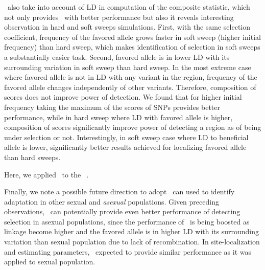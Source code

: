 \comale\ also take into account of LD in computation of the composite 
statistic, which not only provides \comale\ with better performance but also it 
reveals interesting observation in hard and soft sweeps simulations.
First, with the same selection coefficient, frequency of the favored allele 
grows faster in soft sweep (higher initial frequency) than hard sweep, which 
makes identification of selection in soft sweeps a substantially easier task.
Second, favored allele is in lower LD with its surrounding variation in soft 
sweep than hard sweep. In the most extreme case where favored allele is not in 
LD with any variant in the region, frequency of the favored allele changes 
independently of other variants. Therefore, composition of scores does not 
improve power of detection. We found that for higher initial frequency taking 
the maximum of the scores of SNPs provides better performance, while in hard 
sweep where LD with favored allele is higher, composition of scores 
significantly improve power of detecting a region as of being under selection 
or not. Interestingly, in soft sweep case where LD to beneficial allele is 
lower, significantly better results achieved for localizing favored allele than 
hard sweeps.
 



Here, we applied \comale\ to the \data~\cite{orozco2012adaptation}.  

Finally, we note a possible future direction to adopt \comale\ can used to 
identify adaptation in other sexual and \emph{asexual} populations. 
Given preceding observations, \comale\ can potentially provide 
even better performance of detecting selection in asexual populations, since 
the performance of \comale\ is being boosted as linkage become higher and the 
favored allele is in higher LD with its surrounding variation than sexual 
population due to lack of recombination.
In site-localization and estimating 
parameters, \comale\ expected to provide similar performance as it was applied 
to sexual population.



